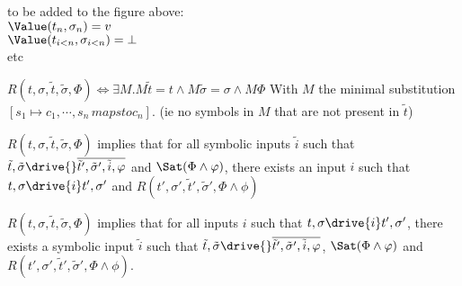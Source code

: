 to be added to the figure above:\\
$\Value(t_n,\sigma_n)=v$\\
$\Value(t_{i<n},\sigma_{i<n})=\bot$\\
etc

\begin{definition}
$R(t,\sigma,\tilde{t},\tilde{\sigma},\Phi)
\iff\exists M . M\tilde{t}=t
\land M\tilde{\sigma}=\sigma
\land M\Phi$
With $M$ the minimal substitution $[s_1\mapsto c_1,\cdots,s_n\,mapsto c_n]$. (ie no symbols in $M$ that are not present in $\tilde{t}$)
\end{definition}

\begin{lemma}
  \label{lem:sounddrivingr}
$R(t,\sigma,\tilde{t},\tilde{\sigma},\Phi)$ implies
that for all symbolic inputs $\tilde{i}$ such that $\tilde{t},\tilde{\sigma}\drive{}\overline{\tilde{t}',\tilde{\sigma}',\tilde{i},\phi}$ and $\Sat(\Phi\land\phi)$,
there exists an input $i$ such that $t,\sigma\drive{i}t',\sigma'$ and $R(t',\sigma',\tilde{t}',\tilde{\sigma}',\Phi\land\phi)$


\end{lemma}

\begin{lemma}
  \label{lem:completedrivingr}
  $R(t,\sigma,\tilde{t},\tilde{\sigma},\Phi)$ implies
  that for all inputs $i$ such that $t,\sigma\drive{i}t',\sigma'$,
  there exists a symbolic input $\tilde{i}$ such that $\tilde{t},\tilde{\sigma}\drive{}\overline{\tilde{t}',\tilde{\sigma}',\tilde{i},\phi}$, $\Sat(\Phi\land\phi)$ and $R(t',\sigma',\tilde{t}',\tilde{\sigma}',\Phi\land\phi)$.
\end{lemma}
